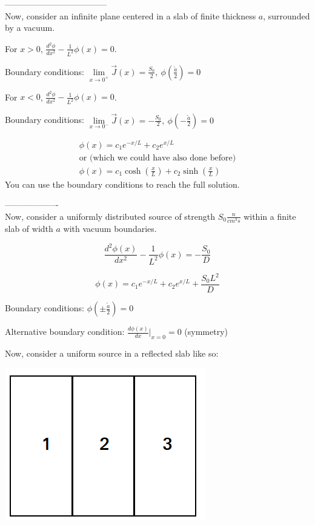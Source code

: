 \documentclass[12pt]{article}
\begin{document}
------------------------------------\\
Now, consider an infinite plane centered in a slab of finite thickness $a$, surrounded by a vacuum.


For $x > 0$, $\frac{d^2\phi}{dx^2} - \frac{1}{L^2}\phi(x) = 0$.


Boundary conditions: 
$\lim\limits_{x\rightarrow 0^+}\vec{J}(x) = \frac{S_0}{2}, \: \phi(\tfrac{\tilde{a}}{2}) = 0$

For $x < 0$, $\frac{d^2\phi}{dx^2} - \frac{1}{L^2}\phi(x) = 0$.

Boundary conditions: 
$\lim\limits_{x\rightarrow 0^-}\vec{J}(x) = -\frac{S_0}{2}, \: \phi(-\tfrac{\tilde{a}}{2}) = 0$

\begin{gather*}
\phi(x) = c_1e^{-x/L} + c_2e^{x/L} \\
\text{or (which we could have also done before)} \\
\phi(x) = c_1\cosh(\tfrac{x}{L}) + c_2\sinh(\tfrac{x}{L})
\end{gather*}
%
You can use the boundary conditions to reach the full solution.


-------------------\\
Now, consider a uniformly distributed source of strength $S_0 \tfrac{n}{cm^3s}$ within a finite slab of
width $a$ with vacuum boundaries.

\begin{equation*}
\frac{d^2\phi(x)}{dx^2} - \frac{1}{L^2}\phi(x) = -\frac{S_0}{D}
\end{equation*}

\begin{equation*}
\phi(x) = c_1e^{-x/L} + c_2e^{x/L} + \frac{S_0L^2}{D}
\end{equation*}

Boundary conditions: $\phi(\pm\tfrac{\tilde{a}}{2}) = 0$


Alternative boundary condition: $\frac{d\phi(x)}{dx}\Bigr|_{x = 0} = 0$ (symmetry)


Now, consider a uniform source in a reflected slab like so:

\begin{center}
\includegraphics[height=2.5 in]{../figs/ref_slab}
\end{center}
\end{document}
